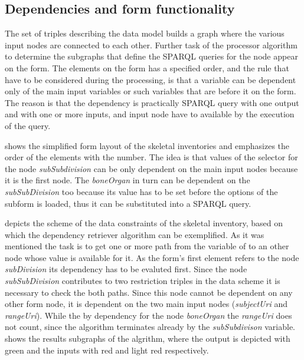 \subsection{Dependencies and form functionality}  \label{512}


The set of triples describing the data model builds a graph where the various input nodes are connected to each other. Further task of the processor algorithm to determine the subgraphs that define the SPARQL queries for the node appear on the form. The elements on the form has a specified order, and the rule that have to be considered during the processing, is that a variable can be dependent only of the main input variables or such variables that are before it on the form. The reason is that the dependency is practically SPARQL query with one output and with one or more inputs, and input node have to available by the execution of the query.


 shows the simplified form layout of the skeletal inventories and emphasizes the order of the elements with the number. The idea is that values of the selector for the node \textit{subSubdivision} can be only dependent on the main input nodes because it is the first node. The \textit{boneOrgan} in turn can be dependent on the \textit{subSubDivision} too because its value has to be set before the options of the subform is loaded, thus it can be substituted into a SPARQL query.



 depicts the scheme of the data constraints of the skeletal inventory, based on which the dependency retriever algorithm can be exemplified. As it was mentioned the task is to get one or more path from the variable of to an other node whose value is available for it.  As the form's first element refers to the node \textit{subDivision} its dependency has to be evaluted first. Since the node \textit{subSubDivision} contributes to two restriction triples in the data scheme it is necessary to check the both paths. Since this node cannot be dependent on any other form node, it is dependent on the two main input nodes (\textit{subjectUri} and \textit{rangeUri}). While the by dependency for the node \textit{boneOrgan} the \textit{rangeUri}
does not count, since the algorithm terminates already by the \textit{subSubdivison} variable.  shows the results subgraphs of the algrithm, where the output is depicted with green and the inputs with red and light red respectively.

